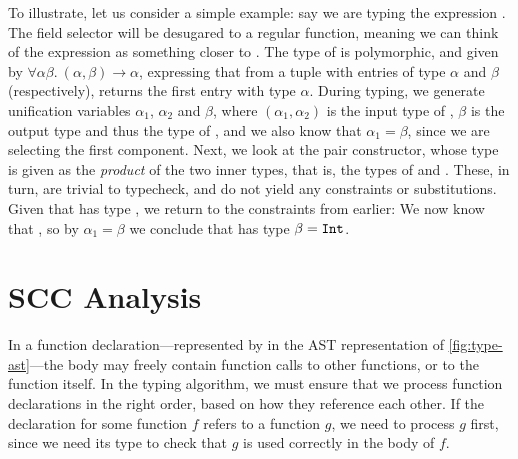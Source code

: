 
To illustrate, let us consider a simple example: say we are typing the
expression . The field selector  will be desugared
to a regular function, meaning we can think of the expression as something
closer to . The type of  is polymorphic, and
given by $\forall \alpha \beta.\ (\alpha,\beta) \to \alpha$, expressing that
from a tuple with entries of type $\alpha$ and $\beta$ (respectively),
 returns the first entry with type $\alpha$.
During typing, we generate unification variables $\alpha_1$, $\alpha_2$ and
$\beta$, where $(\alpha_1,\alpha_2)$ is the input type of , $\beta$
is the output type and thus the type of , and we also know
that $\alpha_1 = \beta$, since we are selecting the first component.
Next, we look at the pair constructor, whose type is given as the \emph{product}
of the two inner types, that is, the types of  and .
These, in turn, are trivial to typecheck, and do not yield any constraints or
substitutions. Given that  has type , we return
to the constraints from earlier:
We now know that , so by
$\alpha_1 = \beta$ we conclude that  has type
$\beta = \texttt{Int}$.





\section{SCC Analysis}

In a function declaration---represented by  in the
AST representation of \cref{fig:type-ast}---the body may freely contain function
calls to other functions, or to the function itself.
In the typing algorithm, we must ensure that we process function declarations in
the right order, based on how they reference each other.
If the declaration for some function $f$ refers to a function $g$, we need to
process $g$ first, since we need its type to check that $g$ is used correctly in
the body of $f$.

